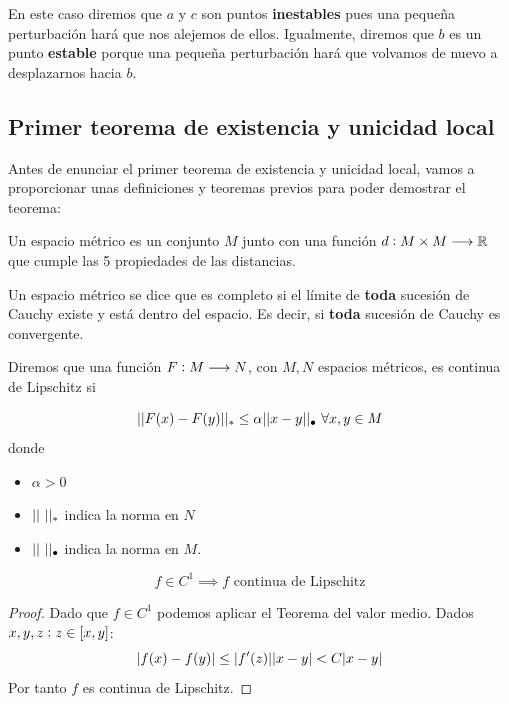 \documentclass{mathnotes}
\begin{document}
En este caso diremos que $a$ y $c$ son puntos \textbf{inestables} pues una pequeña perturbación hará que nos alejemos de ellos. Igualmente, diremos que $b$ es un punto \textbf{estable} porque una pequeña perturbación hará que volvamos de nuevo a desplazarnos hacia $b$.


\subsection{Primer teorema de existencia y unicidad local}
Antes de enunciar el primer teorema de existencia y unicidad local, vamos a proporcionar unas definiciones y teoremas previos para poder demostrar el teorema:

\begin{definition}
Un espacio métrico es un conjunto $M$ junto con una función $d: M\times M \longrightarrow \mathbb{R}$ que cumple las 5 propiedades de las distancias.
\end{definition}

\begin{definition}
Un espacio métrico se dice que es completo si el límite de \textbf{toda} sucesión de Cauchy existe y está dentro del espacio. Es decir, si \textbf{toda} sucesión de Cauchy es convergente.
\end{definition}

\begin{definition}
Diremos que una función $F: M \longrightarrow N$, con $M, N$ espacios métricos, es continua de Lipschitz si

$$||F(x)-F(y)||_* \leq \alpha||x-y||_\bullet\ \forall x,y\in M$$ donde 
\begin{itemize}
\item $\alpha > 0$
\item $||\ ||_*$ indica la norma en $N$
\item $||\ ||_\bullet$ indica la norma en $M$.
\end{itemize}
\end{definition}

\begin{lemma}
$$f\in C^1 \implies f \text{ continua de Lipschitz}$$
\end{lemma}
\begin{proof}
Dado que $f\in C^1$ podemos aplicar el Teorema del valor medio. Dados $x,y,z : z\in[x,y]$:
$$|f(x) - f(y)| \leq |f^\prime(z)||x-y| < C|x-y|$$
Por tanto $f$ es continua de Lipschitz.
\end{proof}
\end{document}
